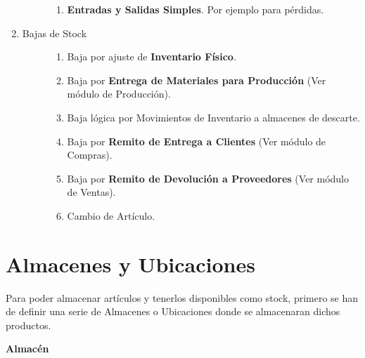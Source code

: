 \documentclass[letterpaper,10pt,spanish]{sphinxmanual}
\begin{document}
\begin{enumerate}
\begin{description}
\begin{enumerate}
\item {} 
\textbf{Entradas y Salidas Simples}. Por ejemplo para pérdidas.

\end{enumerate}

\end{description}

\item {} \begin{description}
\item[{Bajas de Stock}] \leavevmode\begin{enumerate}
\item {} 
Baja por ajuste de \textbf{Inventario Físico}.

\item {} 
Baja por \textbf{Entrega de Materiales para Producción} (Ver módulo de Producción).

\item {} 
Baja lógica por Movimientos de Inventario a almacenes de descarte.

\item {} 
Baja por \textbf{Remito de Entrega a Clientes} (Ver módulo de Compras).

\item {} 
Baja por \textbf{Remito de Devolución a Proveedores} (Ver módulo de Ventas).

\item {} 
Cambio de Artículo.

\end{enumerate}

\end{description}

\end{enumerate}


\section{Almacenes y Ubicaciones}
\label{stock:almacenes-y-ubicaciones}
Para poder almacenar artículos y tenerlos disponibles como stock, primero se han de definir una serie de Almacenes o Ubicaciones donde se almacenaran dichos productos.

\textbf{Almacén}
\end{document}

